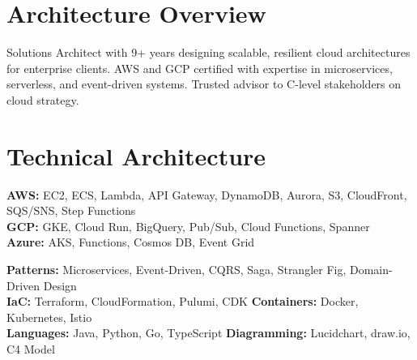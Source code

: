 \documentclass[11pt,a4paper]{article}
\begin{document}
\noindent
{}

\vspace{0.5em}

\section{Architecture Overview}
Solutions Architect with 9+ years designing scalable, resilient cloud architectures for enterprise clients. AWS and GCP certified with expertise in microservices, serverless, and event-driven systems. Trusted advisor to C-level stakeholders on cloud strategy.

\section{Technical Architecture}
\begin{archbox}
\textbf{AWS:} EC2, ECS, Lambda, API Gateway, DynamoDB, Aurora, S3, CloudFront, SQS/SNS, Step Functions\\
\textbf{GCP:} GKE, Cloud Run, BigQuery, Pub/Sub, Cloud Functions, Spanner\\
\textbf{Azure:} AKS, Functions, Cosmos DB, Event Grid
\end{archbox}
\vspace{0.2em}
\begin{archbox}
\textbf{Patterns:} Microservices, Event-Driven, CQRS, Saga, Strangler Fig, Domain-Driven Design\\
\textbf{IaC:} Terraform, CloudFormation, Pulumi, CDK \quad\textbf{Containers:} Docker, Kubernetes, Istio\\
\textbf{Languages:} Java, Python, Go, TypeScript \quad\textbf{Diagramming:} Lucidchart, draw.io, C4 Model
\end{archbox}
\end{document}
